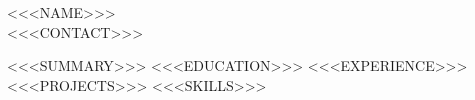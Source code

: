 \documentclass[letterpaper,11pt]{article}   %
\newcommand{\rtNameSize}{\LARGE}            %
\begin{document}
\pagestyle{empty}

\begin{center}
  {\rtNameSize \scshape <<<NAME>>>}\\ \vspace{2pt}
  {\small <<<CONTACT>>>}
\end{center}

<<<SUMMARY>>>
<<<EDUCATION>>>
<<<EXPERIENCE>>>
<<<PROJECTS>>>
<<<SKILLS>>>
\end{document}
